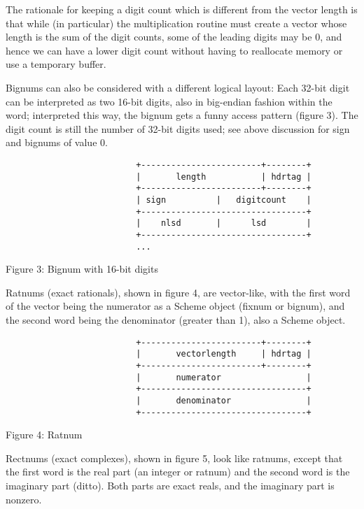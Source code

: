The rationale for keeping a digit count which is different from the vector
length is that while (in particular) the multiplication routine must create
a vector whose length is the sum of the digit counts, some of the leading
digits may be 0, and hence we can have a lower digit count without having
to reallocate memory or use a temporary buffer.

Bignums can also be considered with a different logical layout: Each
32-bit digit can be interpreted as two 16-bit digits, also in
big-endian fashion within the word; interpreted this way, the bignum
gets a funny access pattern (figure 3).  The digit count is still the
number of 32-bit digits used; see above discussion for sign and
bignums of value 0.

\begin{minipage}{\linewidth}
\begin{verbatim}
                          +------------------------+--------+
                          |       length           | hdrtag |
                          +------------------------+--------+
                          | sign          |   digitcount    |
                          +---------------------------------+
                          |    nlsd       |      lsd        |
                          +---------------------------------+
                          ...
\end{verbatim}
\centerline{Figure 3: Bignum with 16-bit digits}
\end{minipage}

Ratnums (exact rationals), shown in figure 4, are vector-like, with
the first word of the vector being the numerator as a Scheme object
(fixnum or bignum), and the second word being the denominator (greater
than 1), also a Scheme object.

\begin{minipage}{\linewidth}
\begin{verbatim}
                          +------------------------+--------+
                          |       vectorlength     | hdrtag |
                          +------------------------+--------+
                          |       numerator                 |
                          +---------------------------------+
                          |       denominator               |
                          +---------------------------------+
\end{verbatim}
\centerline{Figure 4: Ratnum}
\end{minipage}

Rectnums (exact complexes), shown in figure 5, look like ratnums,
except that the first word is the real part (an integer or ratnum) and
the second word is the imaginary part (ditto). Both parts are exact
reals, and the imaginary part is nonzero.

